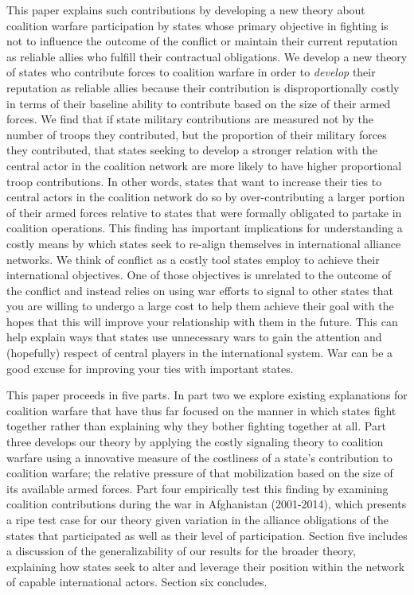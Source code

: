 \documentclass[12pt,letterpaper]{article}
\begin{document}
	This paper explains such contributions by developing a new theory about coalition warfare participation by states whose primary objective in fighting is not to influence the outcome of the conflict or maintain their current reputation as reliable allies who fulfill their contractual obligations. We develop a new theory of states who contribute forces to coalition warfare in order to \textit{develop} their reputation as reliable allies because their contribution is disproportionally costly in terms of their baseline ability to contribute based on the size of their armed forces. We find that if state military contributions are measured not by the number of troops they contributed, but the proportion of their military forces they contributed, that states seeking to develop a stronger relation with the central actor in the coalition network are more likely to have higher proportional troop contributions. In other words, states that want to increase their ties to central actors in the coalition network do so by over-contributing a larger portion of their armed forces relative to states that were formally obligated to partake in coalition operations. This finding has important implications for understanding a costly means by which states seek to re-align themselves in international alliance networks. We think of conflict as a costly tool states employ to achieve their international objectives. One of those objectives is unrelated to the outcome of the conflict and instead relies on using war efforts to signal to other states that you are willing to undergo a large cost to help them achieve their goal with the hopes that this will improve your relationship with them in the future. This can help explain ways that states use unnecessary wars to gain the attention and (hopefully) respect of central players in the international system. War can be a good excuse for improving your ties with important states.

	This paper proceeds in five parts. In part two we explore existing explanations for coalition warfare that have thus far focused on the manner in which states fight together rather than explaining why they bother fighting together at all. Part three develops our theory by applying the costly signaling theory to coalition warfare using a innovative measure of the costliness of a state's contribution to coalition warfare; the relative pressure of that mobilization based on the size of its available armed forces. Part four empirically test this finding by examining coalition contributions during the war in Afghanistan (2001-2014), which presents a ripe test case for our theory given variation in the alliance obligations of the states that participated as well as their level of participation. Section five includes a discussion of the generalizability of our results for the broader theory, explaining how states seek to alter and leverage their position within the network of capable international actors. Section six concludes.
\end{document}
